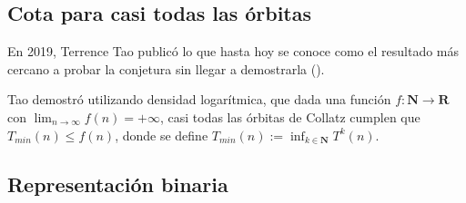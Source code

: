 \subsection{Cota para casi todas las órbitas}
En 2019, Terrence Tao publicó lo que hasta hoy se conoce como el resultado más cercano a probar la conjetura sin llegar a demostrarla (\cite{Tao_2022}).

Tao demostró utilizando densidad logarítmica, que dada una función $f:\mathbf{N}\longrightarrow\mathbf{R}$ con $\lim_{n \to \infty} f(n) = +\infty$, casi todas las órbitas de Collatz cumplen que $T_{min}(n) \leq f(n)$, donde se define $T_{min}(n):=\inf_{k\in\mathbf{N}}T^k(n)$.



\subsection{Representación binaria}
